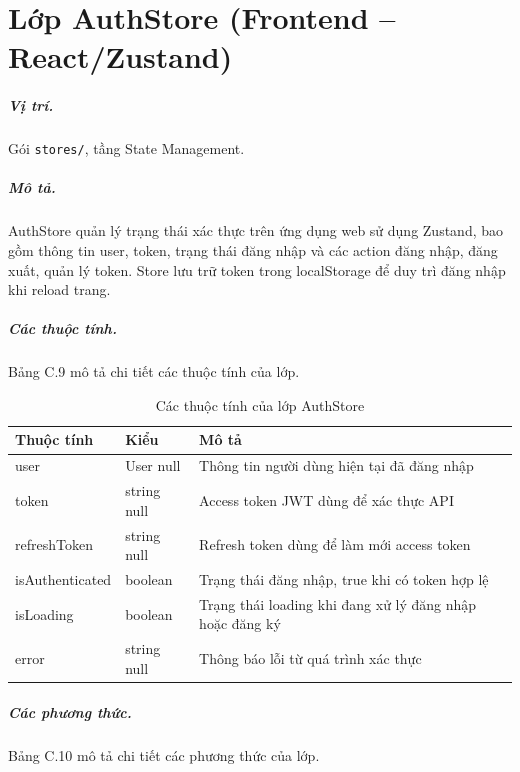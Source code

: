 \documentclass[../DoAn.tex]{subfiles}
\begin{document}
\vspace{0.3cm}

\section{Lớp AuthStore (Frontend -- React/Zustand)}
\label{appendix:auth_store}

\subparagraph{Vị trí.} Gói \texttt{stores/}, tầng State Management.

\subparagraph{Mô tả.} AuthStore quản lý trạng thái xác thực trên ứng dụng web sử dụng Zustand, bao gồm thông tin user, token, trạng thái đăng nhập và các action đăng nhập, đăng xuất, quản lý token. Store lưu trữ token trong localStorage để duy trì đăng nhập khi reload trang.

\subparagraph{Các thuộc tính.} Bảng C.9 mô tả chi tiết các thuộc tính của lớp.

\begin{table}[H]
\centering
\begin{tabular}{|p{4cm}|p{3.5cm}|p{5cm}|}
\hline
\textbf{Thuộc tính} & \textbf{Kiểu} & \textbf{Mô tả} \\ \hline
user & User \textbar{} null & Thông tin người dùng hiện tại đã đăng nhập \\ \hline
token & string \textbar{} null & Access token JWT dùng để xác thực API \\ \hline
refreshToken & string \textbar{} null & Refresh token dùng để làm mới access token \\ \hline
isAuthenticated & boolean & Trạng thái đăng nhập, true khi có token hợp lệ \\ \hline
isLoading & boolean & Trạng thái loading khi đang xử lý đăng nhập hoặc đăng ký \\ \hline
error & string \textbar{} null & Thông báo lỗi từ quá trình xác thực \\ \hline
\end{tabular}
\caption{Các thuộc tính của lớp AuthStore}
\label{table:auth_store_attrs}
\end{table}

\subparagraph{Các phương thức.} Bảng C.10 mô tả chi tiết các phương thức của lớp.
\end{document}
